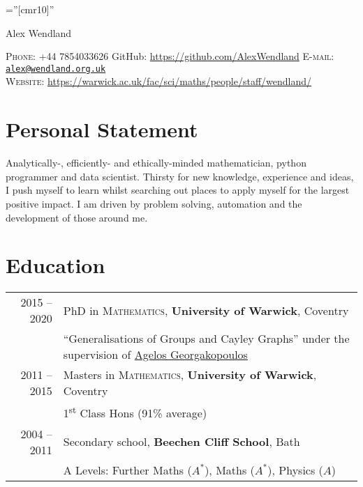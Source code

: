 \documentclass[a4paper,10pt]{article}
\begin{document}
\pagestyle{empty} %

\font\fb=''[cmr10]'' %

\par{\centering
		{\Huge Alex Wendland
	}\bigskip\par}
\vspace{-0.3 cm}
\begin{center}
	\textsc{Phone:} +44 7854033626 \hspace{1cm} GitHub: \href{https://github.com/AlexWendland}{https://github.com/AlexWendland} \hspace{1cm} \textsc{E-mail:} \href{mailto:alex@wendland.org.uk}{\texttt{alex@wendland.org.uk}}\\
	\textsc{Website:} \href{https://warwick.ac.uk/fac/sci/maths/people/staff/wendland/}{https://warwick.ac.uk/fac/sci/maths/people/staff/wendland/}
\end{center}


\section{Personal Statement}
Analytically-, efficiently- and ethically-minded mathematician, python programmer and data scientist. Thirsty for new knowledge, experience and ideas, I push myself to learn whilst searching out places to apply myself for the largest positive impact. I am driven by problem solving, automation and the development of those around me.

\vspace{-0.05 in}

\section{Education}
\begin{tabular}{rl}	
	\textsc{} 2015 -- 2020 & PhD in \textsc{Mathematics}, \textbf{University of Warwick}, Coventry\\
	& ``Generalisations of Groups and Cayley Graphs'' under the supervision of \href{https://homepages.warwick.ac.uk/~maslar/}{Agelos Georgakopoulos}\\
	\textsc{} 2011 -- 2015& Masters in \textsc{Mathematics}, \textbf{University of Warwick}, Coventry\\
	& 1\textsuperscript{st} Class Hons (91\% average)\\
	\textsc{} 2004 -- 2011& Secondary school, \textbf{Beechen Cliff School}, Bath\\
	&  A Levels: Further Maths ($A^{\ast}$), Maths ($A^{\ast}$), Physics ($A$)
\end{tabular}
\end{document}
